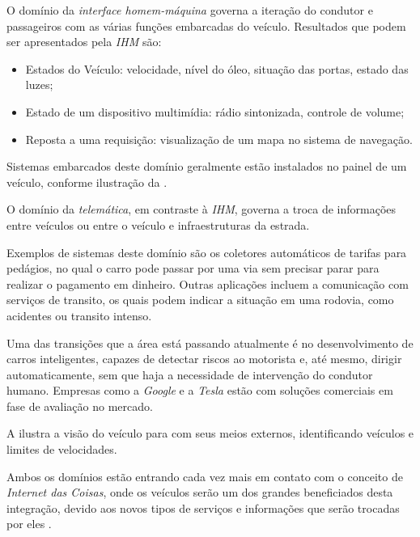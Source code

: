 O domínio da \emph{interface homem-máquina} governa a iteração do condutor e passageiros com as várias funções embarcadas do veículo. Resultados que podem ser apresentados pela \emph{IHM} são:

\begin{itemize}
	\item Estados do Veículo: velocidade, nível do óleo, situação das portas, estado das luzes;
	\item Estado de um dispositivo multimídia: rádio sintonizada, controle de volume;
	\item Reposta a uma requisição: visualização de um mapa no sistema de navegação.
\end{itemize}

Sistemas embarcados deste domínio geralmente estão instalados no painel de um veículo, conforme ilustração da .


O domínio da \emph{telemática}, em contraste à \emph{IHM}, governa a troca de informações entre veículos ou entre o veículo e infraestruturas da estrada.

Exemplos de sistemas deste domínio são os coletores automáticos de tarifas para pedágios, no qual o carro pode passar por uma via sem precisar parar para realizar o pagamento em dinheiro. Outras aplicações incluem a comunicação com serviços de transito, os quais podem indicar a situação em uma rodovia, como acidentes ou transito intenso.

Uma das transições que a área está passando atualmente é no desenvolvimento de carros inteligentes, capazes de detectar riscos ao motorista e, até mesmo, dirigir automaticamente, sem que haja a necessidade de intervenção do condutor humano. Empresas como a \emph{Google} e a \emph{Tesla} estão com soluções comerciais em fase de avaliação no mercado.

A  ilustra a visão do veículo para com seus meios externos, identificando veículos e limites de velocidades.


Ambos os domínios estão entrando cada vez mais em contato com o conceito de \emph{Internet das Coisas}, onde os veículos serão um dos grandes beneficiados desta integração, devido aos novos tipos de serviços e informações que serão trocadas por eles \cite{IoT}.


